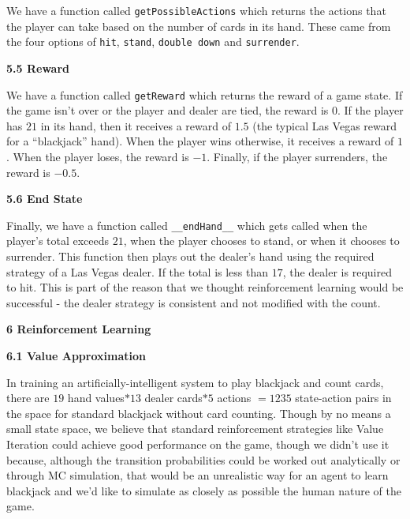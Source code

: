 \documentclass[12pt]{article}
\begin{document}
    We have a function called \texttt{getPossibleActions} which returns the actions that the player can take based on the number of cards in its hand. These came from the four options of \texttt{hit}, \texttt{stand}, \texttt{double down} and \texttt{surrender}. \newline

   \textbf{5.5 Reward} \newline

    We have a function called \texttt{getReward} which returns the reward of a game state. If the game isn't over or the player and dealer are tied, the reward is $0$. If the player has $21$ in its hand, then it receives a reward of $1.5$ (the typical Las Vegas reward for a ``blackjack'' hand). When the player wins otherwise, it receives a reward of $1$. When the player loses, the reward is $-1$. Finally, if the player surrenders, the reward is $-0.5$. \newline

    \textbf{5.6 End State} \newline

    Finally, we have a function called \texttt{\_\_endHand\_\_} which gets called when the player's total exceeds $21$, when the player chooses to stand, or when it chooses to surrender. This function then plays out the dealer's hand using the required strategy of a Las Vegas dealer. If the total is less than $17$, the dealer is required to hit. This is part of the reason that we thought reinforcement learning would be successful - the dealer strategy is consistent and not modified with the count. \newline

    {\large \textbf{6 Reinforcement Learning}} \newline

    \textbf{6.1 Value Approximation} \newline

    In training an artificially-intelligent system to play blackjack and count cards, there are $19$ hand values$* 13$ dealer cards$* 5$ actions $= 1235$ state-action pairs in the space for standard blackjack without card counting. Though by no means a small state space, we believe that standard reinforcement strategies like Value Iteration could achieve good performance on the game, though we didn't use it because, although the transition probabilities could be worked out analytically or through MC simulation, that would be an unrealistic way for an agent to learn blackjack and we'd like to simulate as closely as possible the human nature of the game. \newline
\end{document}
